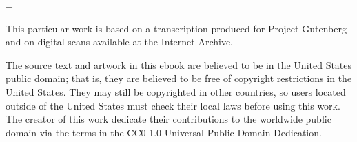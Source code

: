 
\vfil\break

\bgroup
\leavevmode\vfill
\parindent=0pt
\parskip=\baselineskip
\scalemain\typoscale[800/]

This particular work is based on a transcription produced for Project Gutenberg and on digital scans available at the Internet Archive.

The source text and artwork in this ebook are believed to be in the United States public domain; that is, they are believed to be free of copyright restrictions in the United States. They may still be copyrighted in other countries, so users located outside of the United States must check their local laws before using this work. The creator of this work dedicate their contributions to the worldwide public domain via the terms in the CC0 1.0 Universal Public Domain Dedication.
\egroup

